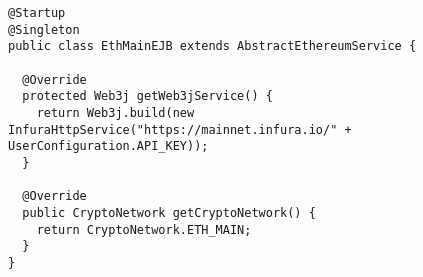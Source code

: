 \begin{lstlisting}[basicstyle=\small]
@Startup
@Singleton
public class EthMainEJB extends AbstractEthereumService {

  @Override
  protected Web3j getWeb3jService() {
    return Web3j.build(new InfuraHttpService("https://mainnet.infura.io/" + UserConfiguration.API_KEY));
  }
  
  @Override
  public CryptoNetwork getCryptoNetwork() {
    return CryptoNetwork.ETH_MAIN;
  }
}
\end{lstlisting}

